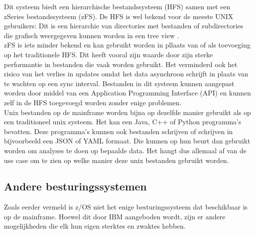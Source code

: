 Dit systeem biedt een hierarchische bestandssysteem (HFS) samen met een zSeries bestandssysteem (zFS). \autocite{Precisely2020} De HFS is wel bekend voor de meeste UNIX gebruikers: Dit is een hierarchie van directories met bestanden of subdirectories die grafisch weergegeven kunnen worden in een tree view \autocite{HCLTechnologies2022}. \\ 
zFS is iets minder bekend en kan gebruikt worden in pllaats van of als toevoeging op het traditionele HFS. Dit heeft vooral zijn waarde door zijn sterke performantie in bestanden die vaak worden gebruikt. Het verminderd ook het risico van het verlies in updates omdat het data asynchroon schrijft in plaats van te wachten op een sync interval. Bestanden in dit systeem kunnen aangepast worden door middel van een Application Programming Interface (API) en kunnen zelf in de HFS toegevoegd worden zonder enige problemen. \autocite{IBM2012} \\

Unix bestanden op de mainframe worden bijna op dezelfde manier gebruikt als op een traditioneel unix systeem. Het kan een Java, C++ of Python programma's bevatten. Deze programma's kunnen ook bestanden schrijven of schrijven in bijvoorbeeld een JSON of YAML formaat. Die kunnen op hun beurt dan gebruikt worden om analyses te doen op bepaalde data. Het hangt dus allemaal af van de use case om te zien op welke manier deze unix bestanden gebruikt worden. \autocite{Precisely2020}

\subsection{Andere besturingssystemen}
Zoals eerder vermeld is z/OS niet het enige besturingssysteem dat beschikbaar is op de mainframe. Hoewel dit door IBM aangeboden wordt, zijn er andere mogelijkheden die elk hun eigen sterktes en zwaktes hebben. \\

